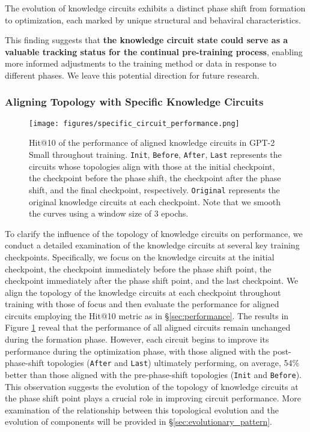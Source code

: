 \begin{tcolorbox}[mybox, title={Takeaway: Biphasic Circuit Evolution}]
The evolution of knowledge circuits exhibits a distinct phase shift from formation to optimization, each marked by unique structural and behaviral characteristics.
\end{tcolorbox}

This finding suggests that \textbf{the knowledge circuit state could serve as a valuable tracking status for the continual pre-training process}, enabling more informed adjustments to the training method or data in response to different phases.
We leave this potential direction for future research.

\subsubsection{Aligning Topology with Specific Knowledge Circuits}
\label{sec:specific_circuit_performance}

\begin{figure}
    \centering
    \texttt{[image: figures/specific\_circuit\_performance.png]}
    \caption{Hit@10 of the performance of aligned knowledge circuits in GPT-2 Small throughout training. \texttt{Init}, \texttt{Before}, \texttt{After},  \texttt{Last} represents the circuits whose topologies align with those at the initial checkpoint, the checkpoint before the phase shift, the checkpoint after the phase shift, and the final checkpoint, respectively. \texttt{Original} represents the original knowledge circuits at each checkpoint. Note that we smooth the curves using a window size of 3 epochs.}
    \label{fig:specific_circuit_performance}
    \vspace{-15pt}
\end{figure}

To clarify the influence of the topology of knowledge circuits on performance, we conduct a detailed examination of the knowledge circuits at several key training checkpoints.
Specifically, we focus on the knowledge circuits at the initial checkpoint, the checkpoint immediately before the phase shift point, the checkpoint immediately after the phase shift point, and the last checkpoint.
We align the topology of the knowledge circuits at each checkpoint throughout training with those of focus and then evaluate the performance for aligned circuits employing the Hit@10 metric as in \S\ref{sec:performance}.
The results in Figure \ref{fig:specific_circuit_performance} reveal that the performance of all aligned circuits remain unchanged during the formation phase.
However, each circuit begins to improve its performance during the optimization phase, with those aligned with the post-phase-shift topologies (\texttt{After} and \texttt{Last}) ultimately performing, on average, 54\% better than those aligned with the pre-phase-shift topologies (\texttt{Init} and \texttt{Before}).
This observation suggests the evolution of the topology of knowledge circuits at the phase shift point plays a crucial role in improving circuit performance.
More examination of the relationship between this topological evolution and the evolution of components will be provided in \S\ref{sec:evolutionary_pattern}.

